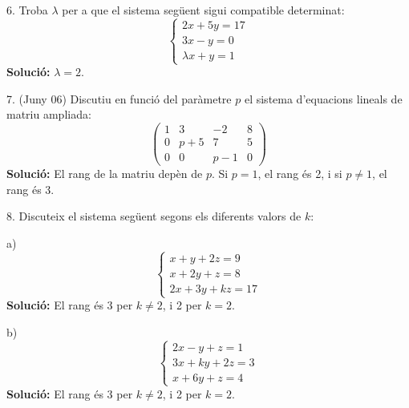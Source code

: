 \documentclass[12pt]{article}
\begin{document}
\begin{exercici}
6. Troba \(\lambda\) per a que el sistema següent sigui compatible determinat:
\[
\begin{cases}
2x + 5y = 17 \\
3x - y = 0 \\
\lambda x + y = 1
\end{cases}
\]
\textbf{Solució:} \(\lambda = 2\).
\end{exercici}

\begin{exercici}
7. (Juny 06) Discutiu en funció del paràmetre \(p\) el sistema d’equacions lineals de matriu ampliada:
\[
\begin{pmatrix}
1 & 3 & -2 & 8 \\
0 & p+5 & 7 & 5 \\
0 & 0 & p-1 & 0
\end{pmatrix}
\]
\textbf{Solució:} El rang de la matriu depèn de \(p\). Si \(p = 1\), el rang és 2, i si \(p \neq 1\), el rang és 3.
\end{exercici}

\begin{exercici}
8. Discuteix el sistema següent segons els diferents valors de \(k\):

a)
\[
\begin{cases}
x + y + 2z = 9 \\
x + 2y + z = 8 \\
2x + 3y + kz = 17
\end{cases}
\]
\textbf{Solució:} El rang és 3 per \(k \neq 2\), i 2 per \(k = 2\).

b)
\[
\begin{cases}
2x - y + z = 1 \\
3x + ky + 2z = 3 \\
x + 6y + z = 4
\end{cases}
\]
\textbf{Solució:} El rang és 3 per \(k \neq 2\), i 2 per \(k = 2\).
\end{exercici}
\end{document}
